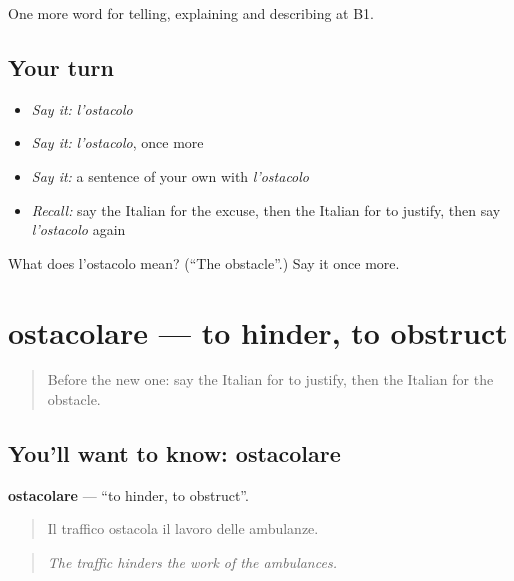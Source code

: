 \begin{grammarlens}[title={What you've built}]
One more word for telling, explaining and describing at B1.
\end{grammarlens}

\subsection*{Your turn}
\begin{itemize}
\raggedright
  \item \emph{Say it:} \emph{l'ostacolo}
  \item \emph{Say it:} \emph{l'ostacolo}, once more
  \item \emph{Say it:} a sentence of your own with \emph{l'ostacolo}
  \item \emph{Recall:} say the Italian for the excuse, then the Italian for to justify, then say \emph{l'ostacolo} again
\end{itemize}

\begin{tcolorbox}[breakable,colback=teal!4,colframe=teal!35!black,title={Before you move on}]
What does l'ostacolo mean? (\textquotedblleft{}The obstacle\textquotedblright{}.) Say it once more.
\end{tcolorbox}
\section[ostacolare]{ostacolare — to hinder, to obstruct}

\label{lesson:IT-C354-ostacolare}



\begin{quote}
Before the new one: say the Italian for to justify, then the Italian for the obstacle.
\end{quote}

\subsection*{You'll want to know: ostacolare}
\textbf{ostacolare} — \textquotedblleft{}to hinder, to obstruct\textquotedblright{}.

\begin{quote}
Il traffico ostacola il lavoro delle ambulanze.
\end{quote}

\begin{quote}
\emph{The traffic hinders the work of the ambulances.}
\end{quote}

